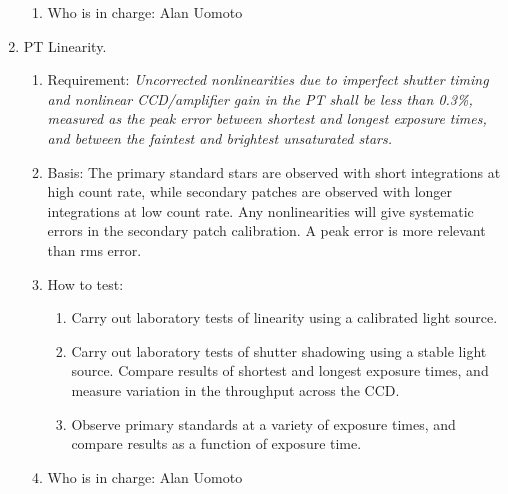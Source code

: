 \begin{enumerate}
\begin{enumerate}
   \item Who is in charge: Alan Uomoto
   \end{enumerate}

\item PT Linearity.
   \begin{enumerate}
   \item Requirement: {\it Uncorrected nonlinearities due to imperfect shutter
	timing and nonlinear CCD/amplifier gain in the PT shall be less than
	0.3\%, measured as the peak error between shortest and longest
	exposure times, and between the faintest and brightest unsaturated stars.}
   \item Basis:  The primary standard stars are observed with short
	integrations at high count rate, while 
	secondary patches are observed with longer integrations at low
	count rate.  Any nonlinearities will give systematic errors in
	the secondary patch calibration. 
	A peak error is more relevant than rms error.  
   \item How to test:
	\begin{enumerate}
	\item Carry out laboratory tests of linearity using a
calibrated light source. 
	\item Carry out laboratory tests of shutter shadowing using a stable
	   light source.  Compare results of shortest and longest
	   exposure times, and measure variation in the throughput
	   across the CCD. 
	\item Observe primary standards at a variety of exposure
	times, and compare results as a function of exposure time. 
	\end{enumerate}
   \item Who is in charge: Alan Uomoto
   \end{enumerate}


\end{enumerate}
